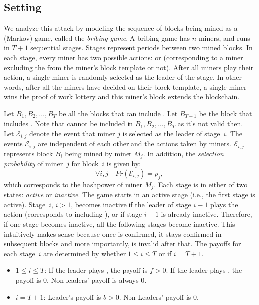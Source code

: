 \subsection{Setting}
We analyze this attack by modeling the sequence of blocks being mined as a (Markov) game, called the \emph{bribing game}. A bribing game has $n$ miners, and runs in $T+1$ sequential stages. Stages represent periods between two mined blocks. In each stage, every miner has two possible actions: \follow{} or  (corresponding to a miner excluding the \sellertxn{} from the miner's block template or not). After all miners play their action, a single miner is randomly selected as the leader of the stage. In other words, after all the miners have decided on their block template, a single miner wins the proof of work lottery and this miner's block extends the blockchain. 

Let $B_1, B_2, \ldots, B_{T}$ be all the blocks that can include \sellertxn{}. Let $B_{T+1}$ be the block that includes \bribetxn{}. Note that \bribetxn{} cannot be included in $B_1, B_2, \ldots, B_{T}$ as it's not valid then. Let $\mathcal{E}_{i,j}$ denote the event that miner $j$ is selected as the leader of stage~$i$. The events $\mathcal{E}_{i,j}$ are independent of each other and the actions taken by miners. $\mathcal{E}_{i,j}$ represents block $B_i$ being mined by miner $M_j$. In addition, the \emph{selection probability} of miner~$j$ for block~$i$ is given by:  
\[
  \forall i,j \quad Pr(\mathcal{E}_{i,j})= p_j,
\]
which corresponds to the hashpower of miner $M_j$. Each stage is in either of two states: \emph{active} or \emph{inactive}. The game starts in an active stage (i.e., the first stage is active). Stage~$i$, $i>1$, becomes inactive if the leader of stage $i-1$ plays the action  (corresponds to including \sellertxn{}), or if stage $i-1$ is already inactive. Therefore, if one stage becomes inactive, all the following stages become inactive. This intuitively makes sense because once \sellertxn{} is confirmed, it stays confirmed in subsequent blocks and more importantly, \bribetxn{} is invalid after that. The payoffs for each stage~$i$ are determined by whether $1\leq i\leq T$ or if $i=T+1$.
\begin{itemize}
    \item $1\leq i\leq T$: If the leader plays , the payoff is $f>0$. If the leader plays \follow{}, the payoff is 0. Non-leaders' payoff is always 0.
    \item $i=T+1$: Leader's payoff is $b>0$. Non-Leaders' payoff is 0.
\end{itemize}

